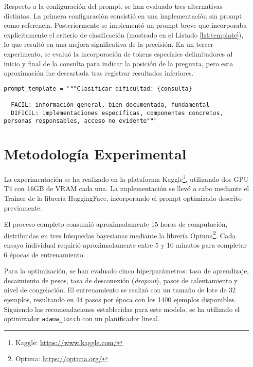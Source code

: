 Respecto a la configuración del prompt, se han evaluado tres alternativas distintas. La primera configuración consistió en una implementación sin prompt como referencia. Posteriormente se implementó un prompt breve que incorporaba explícitamente el criterio de clasificación (mostrado en el Listado \ref{lst:template}), lo que resultó en una mejora significativa de la precisión. En un tercer experimento, se evaluó la incorporación de tokens especiales delimitadores al inicio y final de la consulta para indicar la posición de la pregunta, pero esta aproximación fue descartada tras registrar resultados inferiores.

\begin{lstlisting}[caption={Plantilla del prompt para ejemplos del modelo clasificador},label={lst:template}]
  prompt_template = """Clasificar dificultad: {consulta}

  FACIL: información general, bien documentada, fundamental
  DIFICIL: implementaciones específicas, componentes concretos, personas responsables, acceso no evidente"""
\end{lstlisting}

\section{Metodología Experimental}

La experimentación se ha realizado en la plataforma Kaggle\footnote{Kaggle: \url{https://www.kaggle.com/}}, utilizando dos GPU T4 con 16GB de VRAM cada una. La implementación se llevó a cabo mediante el Trainer de la librería HuggingFace, incorporando el prompt optimizado descrito previamente.

El proceso completo consumió aproximadamente 15 horas de computación, distribuidas en tres búsquedas bayesianas mediante la librería Optuna\footnote{Optuna: \url{https://optuna.org/}}. Cada ensayo individual requirió aproximadamente entre 5 y 10 minutos para completar 6 épocas de entrenamiento.

Para la optimización, se han evaluado cinco hiperparámetros: tasa de aprendizaje, decaimiento de pesos, tasa de desconexión (\textit{dropout}), pasos de calentamiento y nivel de congelación. El entrenamiento se realizó con un tamaño de lote de 32 ejemplos, resultando en 44 pasos por época con los 1400 ejemplos disponibles. Siguiendo las recomendaciones establecidas para este modelo, se ha utilizado el optimizador \texttt{adamw\_torch} con un planificador lineal.

